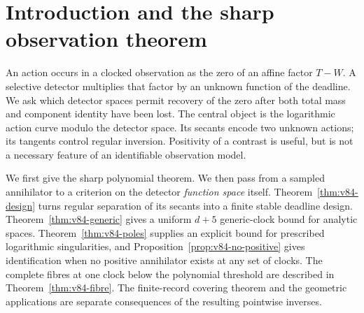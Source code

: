 \section{Introduction and the sharp observation theorem}
\label{sec:v83-main}
An action occurs in a clocked observation as the zero of an affine
factor $T-W$. A selective detector multiplies that factor by an unknown
function of the deadline. We ask which detector spaces permit recovery
of the zero after both total mass and component identity have been lost.
The central object is the logarithmic action curve modulo the detector
space. Its secants encode two unknown actions; its tangents control
regular inversion. Positivity of a contrast is useful, but is not a
necessary feature of an identifiable observation model.

We first give the sharp polynomial theorem. We then pass from a sampled
annihilator to a criterion on the detector \emph{function space} itself.
Theorem~\ref{thm:v84-design} turns regular separation of its secants into
a finite stable deadline design. Theorem~\ref{thm:v84-generic} gives
a uniform $d+5$ generic-clock bound for analytic spaces.
Theorem~\ref{thm:v84-poles} supplies an
explicit bound for prescribed logarithmic singularities, and
Proposition~\ref{prop:v84-no-positive} gives identification when no
positive annihilator exists at any set of clocks. The complete fibres
at one clock below the polynomial threshold are described in
Theorem~\ref{thm:v84-fibre}. The finite-record covering theorem and the
geometric applications are separate consequences of the resulting
pointwise inverses.


